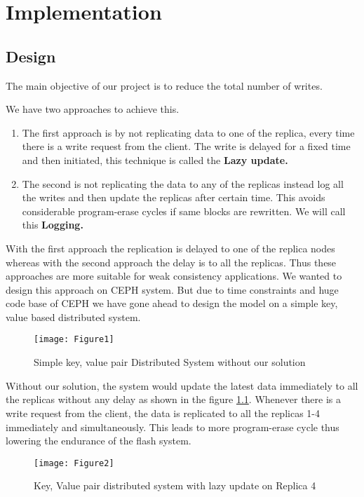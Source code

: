 \chapter{Implementation}

\section{Design}
The main objective of our project is to reduce the total number of writes. 

We have two approaches to achieve this. 
\begin{enumerate}

\item The first approach is by not replicating data to one of the replica, every time there is a write request from the client. The write is delayed for a fixed time and then initiated, this technique is called the \textbf{Lazy update.} 

\item The second is not replicating the data to any of the replicas instead log all the writes and then update the replicas after certain time. This avoids considerable program-erase cycles if same blocks are rewritten. We will call this \textbf{Logging.}

\end{enumerate}

With the first approach the replication is delayed to one of the replica nodes whereas with the second approach the delay is to all the replicas. Thus these approaches are more suitable for weak consistency applications. We wanted to design this approach on CEPH system. But due to time constraints and huge code base of CEPH we have gone ahead to design the model on a simple key, value based distributed system.

\begin{figure}[h]
    \centering
    \texttt{[image: Figure1]}
    \caption{Simple key, value pair Distributed System without our solution}
    \label{fig:21}
\end{figure}

Without our solution, the system would update the latest data immediately to all the replicas without any delay as shown in the figure \ref{fig:21}. Whenever there is a write request from the client, the data is replicated to all the replicas 1-4 immediately and simultaneously. This leads to more program-erase cycle thus lowering the endurance of the flash system.

\begin{figure}[h]
    \centering
    \texttt{[image: Figure2]}
    \caption{Key, Value pair distributed system with lazy update on Replica 4}
    \label{fig:22}
\end{figure}

